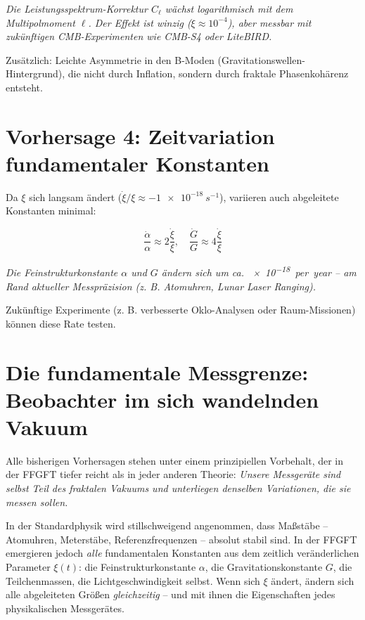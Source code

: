 	\textit{Die Leistungsspektrum-Korrektur \(C_\ell\) wächst logarithmisch mit dem Multipolmoment \(\ell\). Der Effekt ist winzig (\(\xi \approx 10^{-4}\)), aber messbar mit zukünftigen CMB-Experimenten wie CMB-S4 oder LiteBIRD.}
	
	Zusätzlich: Leichte Asymmetrie in den B-Moden (Gravitationswellen-Hintergrund), die nicht durch Inflation, sondern durch fraktale Phasenkohärenz entsteht.
	
	\section{Vorhersage 4: Zeitvariation fundamentaler Konstanten}
	
	Da \(\xi\) sich langsam ändert (\(\dot{\xi}/\xi \approx \SI{-1e-18}{s^{-1}}\)), variieren auch abgeleitete Konstanten minimal:
	
	\begin{equation}
		\frac{\dot{\alpha}}{\alpha} \approx 2 \frac{\dot{\xi}}{\xi}, \quad \frac{\dot{G}}{G} \approx 4 \frac{\dot{\xi}}{\xi}
	\end{equation}
	
	\textit{Die Feinstrukturkonstante \(\alpha\) und \(G\) ändern sich um ca. \SI{e-18}{per year} – am Rand aktueller Messpräzision (z. B. Atomuhren, Lunar Laser Ranging).}
	
	Zukünftige Experimente (z. B. verbesserte Oklo-Analysen oder Raum-Missionen) können diese Rate testen.
	
	\section{Die fundamentale Messgrenze: Beobachter im sich wandelnden Vakuum}
	
	Alle bisherigen Vorhersagen stehen unter einem prinzipiellen Vorbehalt, der in der FFGFT tiefer reicht als in jeder anderen Theorie: \textit{Unsere Messgeräte sind selbst Teil des fraktalen Vakuums und unterliegen denselben Variationen, die sie messen sollen.}
	
	In der Standardphysik wird stillschweigend angenommen, dass Maßstäbe -- Atomuhren, Meterstäbe, Referenzfrequenzen -- absolut stabil sind. In der FFGFT emergieren jedoch \textit{alle} fundamentalen Konstanten aus dem zeitlich veränderlichen Parameter $\xi(t)$: die Feinstrukturkonstante $\alpha$, die Gravitationskonstante $G$, die Teilchenmassen, die Lichtgeschwindigkeit selbst. Wenn sich $\xi$ ändert, ändern sich alle abgeleiteten Größen \textit{gleichzeitig} -- und mit ihnen die Eigenschaften jedes physikalischen Messgerätes.
	
